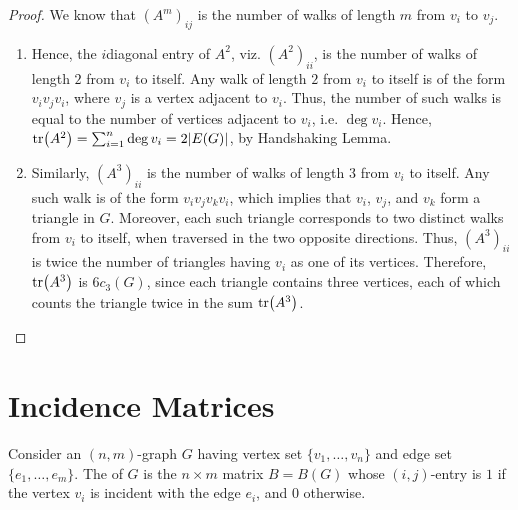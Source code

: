 \begin{proof}
We know that $(A^m)_{ij}$ is the number of walks of length $m$ from $v_i$ to $v_j$.
\begin{enumerate}[label=(\roman*)]
\item Hence, the $i$\nth diagonal entry of $A^2$, viz. $(A^2)_{ii}$, is the number of walks of length $2$ from $v_i$ to itself. Any walk of length $2$ from $v_i$ to itself is of the form $v_i v_j v_i$, where $v_j$ is a vertex adjacent to $v_i$. Thus, the number of such walks is equal to the number of vertices adjacent to $v_i$, i.e. $\deg v_i$. Hence, $\tr(A^2) = \sum_{i=1}^n \deg v_i = 2|E(G)|$, by Handshaking Lemma.

\item Similarly, $(A^3)_{ii}$ is the number of walks of length $3$ from $v_i$ to itself. Any such walk is of the form $v_i v_j v_k v_i$, which implies that $v_i$, $v_j$, and $v_k$ form a triangle in $G$. Moreover, each such triangle corresponds to two distinct walks from $v_i$ to itself, when traversed in the two opposite directions. Thus, $(A^3)_{ii}$ is twice the number of triangles having $v_i$ as one of its vertices. Therefore, $\tr(A^3)$ is $6 c_3(G)$, since each triangle contains three vertices, each of which counts the triangle twice in the sum $\tr(A^3)$.
\end{enumerate}
\end{proof}

\section{Incidence Matrices}\label{sec:IncMat}

Consider an $(n, m)$-graph $G$ having vertex set $\{v_1, \ldots, v_n\}$ and edge set $\{e_1, \ldots, e_m\}$. The  of $G$ is the $n \times m$ matrix $B = B(G)$ whose $(i, j)$-entry is $1$ if the vertex $v_i$ is incident with the edge $e_i$, and $0$ otherwise.

